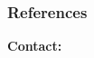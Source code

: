 \documentclass{libs/ufc_format}
\begin{document}
\begin{frame}[allowframebreaks]
    \frametitle{References}
    \printbibliography
\end{frame}

\begin{frame}{}
    \centering
    \huge{\textbf{}}
    
    \vspace{1cm}
    
    \Large{\textbf{Contact:}}
    \newline
    \vspace*{0.5cm}
    \large{}
\end{frame}
\end{document}
